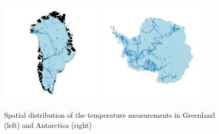 \documentclass[journal abbreviation, manuscript]{copernicus}
\begin{document}
\begin{figure}[!htb]
\caption{Spatial distribution of the temperature measurements in Greenland (left) and Antarctica (right)}
\centering
\includegraphics[width=0.45\textwidth]{figures/temperature_map_greenland.png}
\includegraphics[width=0.45\textwidth]{figures/temperature_map_antarctica.png}
\end{figure}
\end{document}
